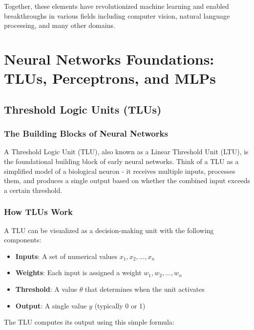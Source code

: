 \documentclass[
  letterpaper,
  DIV=11,
  numbers=noendperiod]{scrreprt}
\providecommand{\tightlist}{%
  \setlength{\itemsep}{0pt}\setlength{\parskip}{0pt}}\usepackage{longtable,booktabs,array}
\begin{document}
Together, these elements have revolutionized machine learning and
enabled breakthroughs in various fields including computer vision,
natural language processing, and many other domains.


\chapter{Neural Networks Foundations: TLUs, Perceptrons, and
MLPs}\label{neural-networks-foundations-tlus-perceptrons-and-mlps}

\section{Threshold Logic Units (TLUs)}\label{threshold-logic-units-tlus}

\subsection{The Building Blocks of Neural
Networks}\label{the-building-blocks-of-neural-networks}

A Threshold Logic Unit (TLU), also known as a Linear Threshold Unit
(LTU), is the foundational building block of early neural networks.
Think of a TLU as a simplified model of a biological neuron - it
receives multiple inputs, processes them, and produces a single output
based on whether the combined input exceeds a certain threshold.

\subsection{How TLUs Work}\label{how-tlus-work}

A TLU can be visualized as a decision-making unit with the following
components:

\begin{itemize}
\tightlist
\item
  \textbf{Inputs}: A set of numerical values \(x_1, x_2, ..., x_n\)
\item
  \textbf{Weights}: Each input is assigned a weight
  \(w_1, w_2, ..., w_n\)
\item
  \textbf{Threshold}: A value \(\theta\) that determines when the unit
  activates
\item
  \textbf{Output}: A single value \(y\) (typically 0 or 1)
\end{itemize}

The TLU computes its output using this simple formula:
\end{document}
